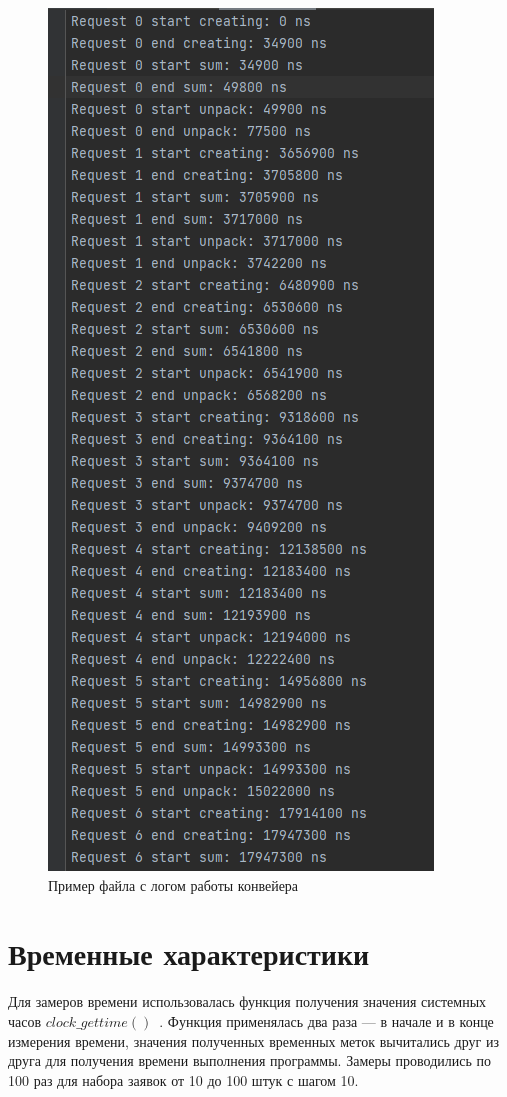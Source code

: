\begin{figure}[h]
	\centering
	\includegraphics[height=0.5\textheight]{img/log.png}
	\caption{Пример файла с логом работы конвейера}
	\label{img:log}
\end{figure}

\clearpage

\section{Временные характеристики}

Для замеров времени использовалась функция получения значения системных часов $clock\_gettime()$~\cite{cpp-time}. Функция применялась два раза --- в начале и в конце измерения времени, значения полученных временных меток вычитались друг из друга для получения времени выполнения программы.
Замеры проводились по 100 раз для набора заявок от 10 до 100 штук с шагом 10. 

